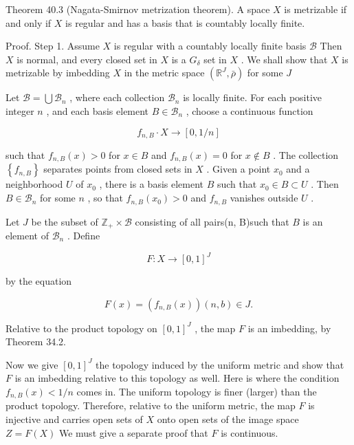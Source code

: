 Theorem 40.3 (Nagata-Smirnov metrization theorem). A space \(X\) is metrizable if and only if \(X\) is regular and has a basis that is countably locally finite.

Proof. Step 1. Assume \(X\) is regular with a countably locally finite basis \(\mathcal{B}\) Then \(X\) is normal, and every closed set in \(X\) is a \({G}_{\delta }\) set in \(X\) . We shall show that \(X\) is metrizable by imbedding \(X\) in the metric space \(\left( {{\mathbb{R}}^{J},\bar{\rho }}\right)\) for some \(J\)

Let \(\mathcal{B} = \bigcup {\mathcal{B}}_{n}\) , where each collection \({\mathcal{B}}_{n}\) is locally finite. For each positive integer \(n\) , and each basis element \(B \in  {\mathcal{B}}_{n}\) , choose a continuous function

\[
{f}_{n,B} \cdot  X \rightarrow  \left\lbrack  {0,1/n}\right\rbrack
\]

such that \({f}_{n,B}\left( x\right)  > 0\) for \(x \in  B\) and \({f}_{n,B}\left( x\right)  = 0\) for \(x \notin  B\) . The collection \(\left\{  {f}_{n,B}\right\}\) separates points from closed sets in \(X\) . Given a point \({x}_{0}\) and a neighborhood \(U\) of \({x}_{0}\) , there is a basis element \(B\) such that \({x}_{0} \in  B \subset  U\) . Then \(B \in  {\mathcal{B}}_{n}\) for some \(n\) , so that \({f}_{n,B}\left( {x}_{0}\right)  > 0\) and \({f}_{n,B}\) vanishes outside \(U\) .

Let \(J\) be the subset of \({\mathbb{Z}}_{ + } \times  \mathcal{B}\) consisting of all pairs(n, B)such that \(B\) is an element of \({\mathcal{B}}_{n}\) . Define

\[
F : X \rightarrow  {\left\lbrack  0,1\right\rbrack  }^{J}
\]

by the equation

\[
F\left( x\right)  = \left( {{f}_{n,B}\left( x\right) }\right) \left( {n,b}\right)  \in  J.
\]

Relative to the product topology on \({\left\lbrack  0,1\right\rbrack  }^{J}\) , the map \(F\) is an imbedding, by Theorem 34.2.

Now we give \({\left\lbrack  0,1\right\rbrack  }^{J}\) the topology induced by the uniform metric and show that \(F\) is an imbedding relative to this topology as well. Here is where the condition \({f}_{n,B}\left( x\right)  < 1/n\) comes in. The uniform topology is finer (larger) than the product topology. Therefore, relative to the uniform metric, the map \(F\) is injective and carries open sets of \(X\) onto open sets of the image space \(Z = F\left( X\right)\) We must give a separate proof that \(F\) is continuous.

